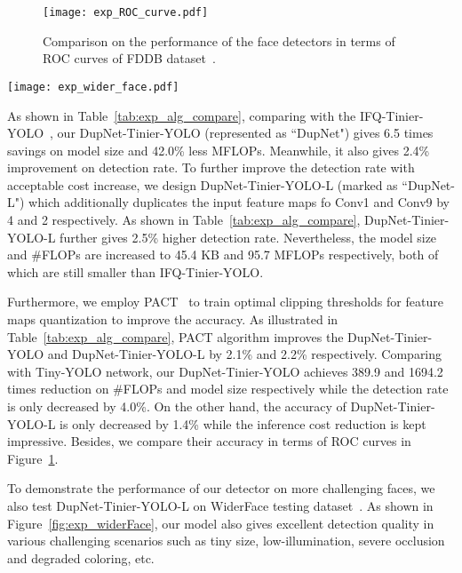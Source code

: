 \documentclass[10pt,twocolumn,letterpaper]{article}
\begin{document}
\begin{figure}[!htb]
	\begin{center}
		\texttt{[image: exp\_ROC\_curve.pdf]}
	\end{center}
	\caption{Comparison on the performance of the face detectors  in terms of ROC curves of FDDB dataset~\cite{FDDB}.}
	\label{fig:exp_alg_comp}
\end{figure}

\begin{figure*}[!htb]
	\centering
	\texttt{[image: exp\_wider\_face.pdf]}
	\caption{Qualitative results of the proposed DupNet-Tinier-YOLO-L face detector on Wider Face dataset~\cite{widerface}. }
	\label{fig:exp_widerFace}
\end{figure*}

As shown in Table~\ref{tab:exp_alg_compare}, comparing with the IFQ-Tinier-YOLO~\cite{IFQNet}, our DupNet-Tinier-YOLO (represented as ``DupNet") gives 6.5 times savings on model size and 42.0\%  less MFLOPs. Meanwhile, it also gives 2.4\% improvement on detection rate. To further improve the detection rate with acceptable cost increase, we design DupNet-Tinier-YOLO-L (marked as ``DupNet-L")  which additionally duplicates the input feature maps fo Conv1 and Conv9 by 4 and 2 respectively. As shown in Table~\ref{tab:exp_alg_compare},  DupNet-Tinier-YOLO-L further gives 2.5\% higher detection rate. Nevertheless, the model size and \#FLOPs are increased to 45.4 KB and 95.7 MFLOPs respectively, both of which are still smaller than IFQ-Tinier-YOLO.

Furthermore, we employ PACT~\cite{PACT} to train optimal clipping thresholds for feature maps quantization to improve the accuracy. As illustrated in Table~\ref{tab:exp_alg_compare}, PACT algorithm improves the DupNet-Tinier-YOLO and DupNet-Tinier-YOLO-L by 2.1\% and 2.2\% respectively. Comparing with Tiny-YOLO network, our DupNet-Tinier-YOLO achieves 389.9 and 1694.2 times reduction on \#FLOPs and model size respectively while the detection rate is only decreased by 4.0\%. On the other hand, the accuracy of DupNet-Tinier-YOLO-L is only decreased by 1.4\% while the inference cost reduction is kept impressive. Besides, we compare their accuracy in terms of ROC curves in Figure~\ref{fig:exp_alg_comp}.


To demonstrate the performance of our detector on more challenging faces, we also test DupNet-Tinier-YOLO-L on WiderFace testing dataset~\cite{widerface}. As shown in Figure~\ref{fig:exp_widerFace}, our model also gives excellent detection quality in various challenging scenarios such as tiny size, low-illumination, severe occlusion and degraded coloring, etc.
\end{document}
